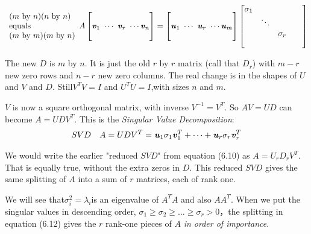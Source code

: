 \begin{align}
\begin{array}{l}
(m \ \text{by} \ n)(n \ \text{by} \ n) \\
\text{equals} \\              
(m \ \text{by} \ m) (m \ \text{by} \ n)
\end{array}  A
\begin{bmatrix}
\ \\
\textbf{\textit{v}}_{1} \ \cdots \ \textbf{\textit{v}}_{r} \ \cdots \textbf{\textit{v}}_{n}\\
\ 
\end{bmatrix}=
\begin{bmatrix}
\ \\
\textbf{\textit{u}}_{1} \ \cdots \ \textbf{\textit{u}}_{r} \ \cdots \textbf{\textit{u}}_{m}\\
\ 
\end{bmatrix}
\begin{bmatrix}
\sigma_{1}  & & &\\
& \ddots & &\\
& & \sigma_{r} & \\
& & & & 
\end{bmatrix}
\end{align}

\begin{flushleft}
	The new $D$ is $m$ by $n$. It is just the old $r$ by $r$ matrix (call that $D_{r}$) with $m-r$ new zero rows and $n-r$ new zero columns. The real change is in the shapes of $U$ and $V$ and $D$. Still$V^{T }V = I$ and $U^{T }U=I$,with sizes $n$ and $m$.
\end{flushleft}

$V$ is now a square orthogonal matrix, with inverse $V^{-1}=V^{T}$. So $AV=UD$ can become $A=UDV^{T}$. This is the \textit{Singular Value Decomposition}:
\begin{align}
SVD & &  A=UDV^{T}=\textbf{\textit{u}}_{1}\sigma_{ 1}\textbf{\textit{v}}^{T}_{1}+\cdots+\textbf{\textit{u}}_{r}\sigma_{ r}\textbf{\textit{v}}^{T}_{ r}
\end{align}

\begin{flushleft}
	We would write the earlier "reduced $SVD$" from equation (6.10) as $A=U_{r}D_{r}V^{T}$. That is equally true, without the extra zeros in $D$. This reduced $SVD$ gives the same splitting of $A$ into a sum of $r$ matrices, each of rank one.
\end{flushleft}

We will see that$ \sigma^{2}_{i}=\lambda_{i}$is an eigenvalue of $A^{T}A$ and also $AA^{T}$. When we put the singular values in descending order, $\sigma_{1}\geq \sigma_{2} \geq \ldots \geq \sigma_{r}> 0$，the splitting in equation (6.12) gives the $r$ rank-one pieces of $A$ \textit{in order of importance}.

